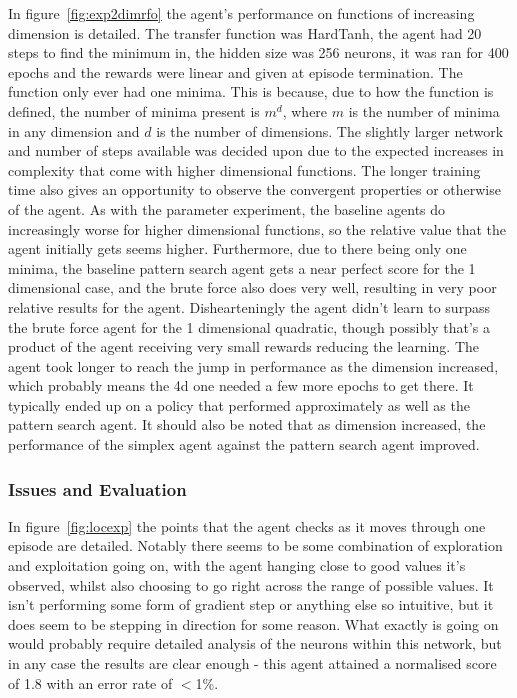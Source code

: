 In figure~\ref{fig:exp2dimrfo} the agent's performance on functions of increasing dimension is detailed. The transfer function was HardTanh, the agent had 20 steps to find the minimum in, the hidden size was 256 neurons, it was ran for 400 epochs and the rewards were linear and given at episode termination. The function only ever had one minima. This is because, due to how the function is defined, the number of minima present is $m^d$, where $m$ is the number of minima in any dimension and $d$ is the number of dimensions. The slightly larger network and number of steps available was decided upon due to the expected increases in complexity that come with higher dimensional functions. The longer training time also gives an opportunity to observe the convergent properties or otherwise of the agent. As with the parameter experiment, the baseline agents do increasingly worse for higher dimensional functions, so the relative value that the agent initially gets seems higher. Furthermore, due to there being only one minima, the baseline pattern search agent gets a near perfect score for the 1 dimensional case, and the brute force also does very well, resulting in very poor relative results for the agent. Dishearteningly the agent didn't learn to surpass the brute force agent for the 1 dimensional quadratic, though possibly that's a product of the agent receiving very small rewards reducing the learning. The agent took longer to reach the jump in performance as the dimension increased, which probably means the 4d one needed a few more epochs to get there. It typically ended up on a policy that performed approximately as well as the pattern search agent. It should also be noted that as dimension increased, the performance of the simplex agent against the pattern search agent improved.
\subsubsection{Issues and Evaluation}

In figure~\ref{fig:locexp} the points that the agent checks as it moves through one episode are detailed. Notably there seems to be some combination of exploration and exploitation going on, with the agent hanging close to good values it's observed, whilst also choosing to go right across the range of possible values. It isn't performing some form of gradient step or anything else so intuitive, but it does seem to be stepping in direction for some reason. What exactly is going on would probably require detailed analysis of the neurons within this network, but in any case the results are clear enough - this agent attained a normalised score of 1.8 with an error rate of $<$1\%. 

